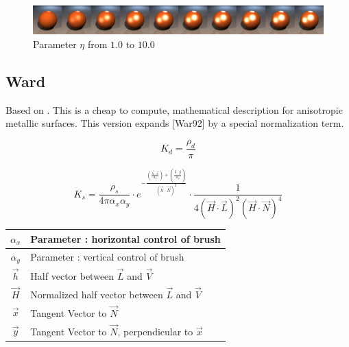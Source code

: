 \documentclass[11pt,a4paper]{article}
\begin{document}
\begin{figure}[H]
\includegraphics[width=\textwidth]{ctfresnelcomplete.png}
\caption{Parameter $\eta$ from $1.0$ to $10.0$}
\end{figure}


\newpage
\subsection{Ward}
Based on \cite{GMD10}. This is a cheap to compute, mathematical description for anisotropic metallic surfaces. This version expands [War92] by a special normalization term. 

\begin{equation}
K_d = \frac{\rho_d}{\pi}
\end{equation}

\begin{equation}
K_s = \frac{\rho_s}{4 \pi \alpha_x \alpha_y } 
\cdot e^
{
- \frac{(\frac{\vec{h} \cdot \vec{x}}{\alpha_x})+(\frac{\vec{h} \cdot \vec{y}}{\alpha_y})}
{(\vec{h} \cdot \vec{N})^2}
}
\cdot 
\frac{1}{4 (\vec{H} \cdot \vec{L})^2 (\vec{H} \cdot \vec{N})^4}
\end{equation}

\begin{table}[H]
\begin{tabular}{| c | l |}
\hline
$\alpha_x$ & Parameter : horizontal control of brush\\ \hline
$\alpha_y$ & Parameter : vertical control of brush \\ \hline
$\vec{h}$ & Half vector between $\vec{L}$ and $\vec{V}$ \\ \hline
$\vec{H}$ & Normalized half vector between $\vec{L}$ and $\vec{V}$ \\ \hline
$\vec{x}$ & Tangent Vector to $\vec{N}$ \\ \hline
$\vec{y}$ & Tangent Vector to $\vec{N}$, perpendicular to $\vec{x}$ \\ \hline
\end{tabular}
\end{table}
\end{document}
